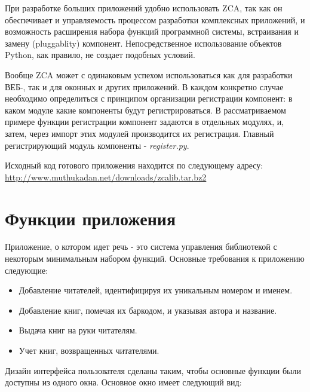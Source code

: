 \documentclass[14pt,a4paper,openany,twoside,final]{extbook}
\providecommand*{\DUroletitlereference}[1]{\textsl{#1}}
\begin{document}
При разработке больших приложений удобно использовать ZCA, так как он
обеспечивает и управляемость процессом разработки комплексных
приложений, и возможность расширения набора функций программной
системы, встраивания и замену (pluggablity) компонент.
Непосредственное использование объектов Python, как правило, не
создает подобных условий.

Вообще ZCA может с одинаковым успехом использоваться как для
разработки ВЕБ-, так и для оконных и других приложений.  В каждом
конкретно случае необходимо определиться с принципом организации
регистрации компонент: в каком модуле какие компоненты будут
регистрироваться.  В рассматриваемом примере функции регистрации
компонент задаются в отдельных модулях, и, затем, через импорт этих
модулей производится их регистрация.  Главный регистрирующий модуль
компоненты - \DUroletitlereference{register.py}.

Исходный код готового приложения находится по следующему адресу:
\url{http://www.muthukadan.net/downloads/zcalib.tar.bz2}


\section{Функции приложения%
  \label{id51}%
}

Приложение, о котором идет речь - это система управления библиотекой с
некоторым минимальным набором функций.  Основные требования к
приложению следующие:

\begin{itemize}

\item Добавление читателей, идентифицируя их уникальным номером и именем.

\item Добавление книг, помечая их баркодом, и указывая автора и название.

\item Выдача книг на руки читателям.

\item Учет книг, возвращенных читателями.

\end{itemize}

Дизайн интерфейса пользователя сделаны таким, чтобы основные функции
были доступны из одного окна.  Основное окно имеет следующий вид:

\noindent{}
\end{document}
